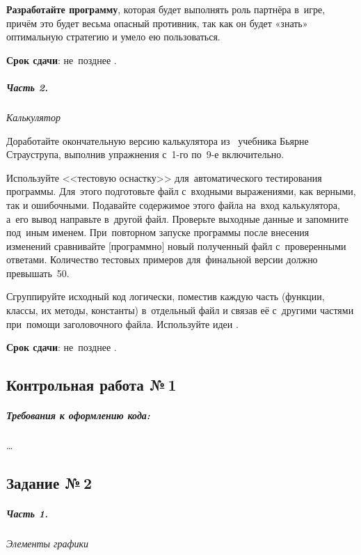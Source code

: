 \documentclass[a4paper,11pt,landscape,notitlepage,oneside,openany,final]{memoir}
\begin{document}
\bigskip

\textbf{Разработайте программу}, которая будет выполнять роль партнёра в~игре, причём это будет весьма опасный противник, так как он будет «знать» оптимальную стратегию и умело ею пользоваться.

\medskip

\textbf{Срок сдачи}: не~позднее .



\subparagraph{Часть 2.}
\textit{Калькулятор}

Доработайте окончательную версию калькулятора из~ учебника Бьярне Страуструпа, выполнив упражнения с~1-го по~9-е включительно.

Используйте <<тестовую оснастку>> для~автоматического тестирования программы. Для~этого подготовьте файл с~входными выражениями, как верными, так и ошибочными. Подавайте содержимое этого файла на~вход калькулятора, а~его вывод направьте в~другой файл. Проверьте выходные данные и запомните под~иным именем. При~повторном запуске программы после внесения изменений сравнивайте [программно] новый полученный файл с~проверенными ответами. Количество тестовых примеров для~финальной версии должно превышать~50.

Сгруппируйте исходный код логически, поместив каждую часть (функции, классы, их методы, константы) в~отдельный файл и связав её с~другими частями при~помощи заголовочного файла. Используйте идеи .

\medskip

\textbf{Срок сдачи}: не~позднее .



\subsection{Контрольная работа №\,1}
\subparagraph{Требования к оформлению кода:}
\ldots



\vspace{0pt plus 2fil}
\subsection{Задание №\,2}
\subparagraph{Часть 1.}
\textit{Элементы графики}
\end{document}
